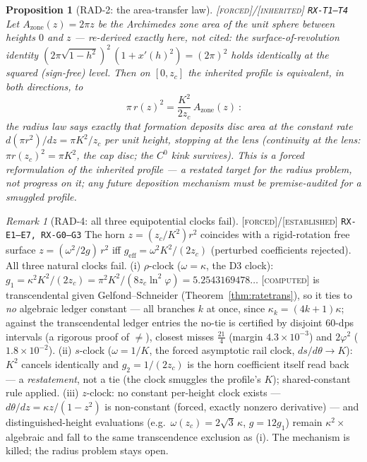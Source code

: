 \documentclass[11pt]{article}
\newcommand{\tagF}{\textcolor{cF}{\textsc{[forced]}}}
\newcommand{\tagC}{\textcolor{cC}{\textsc{[computed]}}}
\newcommand{\tagI}{\textcolor{cI}{\textsc{[inherited]}}}
\newcommand{\tagE}{\textcolor{cE}{\textsc{[established]}}}
\newcommand{\hx}[1]{\textcolor{cC}{\footnotesize\texttt{#1}}}
\newcommand{\gp}{\varphi}
\theoremstyle{plain}
\newtheorem{proposition}[theorem]{Proposition}
\theoremstyle{definition}
\theoremstyle{remark}
\newtheorem{remark}[theorem]{Remark}
\begin{document}
\begin{proposition}[RAD-2: the area-transfer law]\label{prop:areatransfer}\tagF{}/\tagI{} \hx{RX-T1--T4}
Let $A_{\mathrm{zone}}(z)=2\pi z$ be the Archimedes zone area of the unit
sphere between heights $0$ and $z$ --- re-derived exactly here, not cited:
the surface-of-revolution identity
$(2\pi\sqrt{1-h^2})^2\,(1+x'(h)^2)=(2\pi)^2$ holds identically at the
squared (sign-free) level. Then on $[0,z_c]$ the inherited profile is
equivalent, in both directions, to
\[
\boxed{\ \pi\,r(z)^2=\frac{K^2}{2z_c}\,A_{\mathrm{zone}}(z)\ }:
\]
the radius law says exactly that formation deposits disc area at the
constant rate $d(\pi r^2)/dz=\pi K^2/z_c$ per unit height, stopping at the
lens (continuity at the lens: $\pi r(z_c)^2=\pi K^2$, the cap disc; the
$C^0$ kink survives). This is a \emph{forced reformulation} of the
inherited profile --- a restated target for the radius problem, not
progress on it; any future deposition mechanism must be premise-audited
for a smuggled profile.
\end{proposition}

\begin{remark}[RAD-4: all three equipotential clocks fail]\label{rem:rad4}\tagF{}/\tagE{} \hx{RX-E1--E7, RX-G0--G3}
The horn $z=(z_c/K^2)r^2$ coincides with a rigid-rotation free surface
$z=(\omega^2/2g)\,r^2$ iff $g_{\mathrm{eff}}=\omega^2K^2/(2z_c)$
(perturbed coefficients rejected). All three natural clocks fail. (i)
$\rho$-clock ($\omega=\kappa$, the D3 clock):
$g_1=\kappa^2K^2/(2z_c)=\pi^2K^2/(8z_c\ln^2\gp)=5.2543169478\ldots$
\tagC{} is transcendental given Gelfond--Schneider
(Theorem~\ref{thm:ratetrans}), so it ties to \emph{no} algebraic ledger
constant --- all branches $k$ at once, since $\kappa_k=(4k+1)\kappa$;
against the transcendental ledger entries the no-tie is certified by
disjoint 60-dps intervals (a rigorous proof of $\neq$), closest misses
$\tfrac{21}4$ (margin $4.3\times10^{-3}$) and $2\gp^2$
($1.8\times10^{-2}$). (ii) $s$-clock ($\omega=1/K$, the forced asymptotic
rail clock, $ds/d\theta\to K$): $K^2$ cancels identically and
$g_2=1/(2z_c)$ is the horn coefficient itself read back --- a
\emph{restatement}, not a tie (the clock smuggles the profile's $K$);
shared-constant rule applied. (iii) $z$-clock: no constant per-height
clock exists --- $d\theta/dz=\kappa z/(1-z^2)$ is non-constant (forced,
exactly nonzero derivative) --- and distinguished-height evaluations
(e.g.\ $\omega(z_c)=2\sqrt3\,\kappa$, $g=12g_1$) remain
$\kappa^2\times{}$algebraic and fall to the same transcendence exclusion
as (i). The mechanism is killed; the radius problem stays open.
\end{remark}
\end{document}
